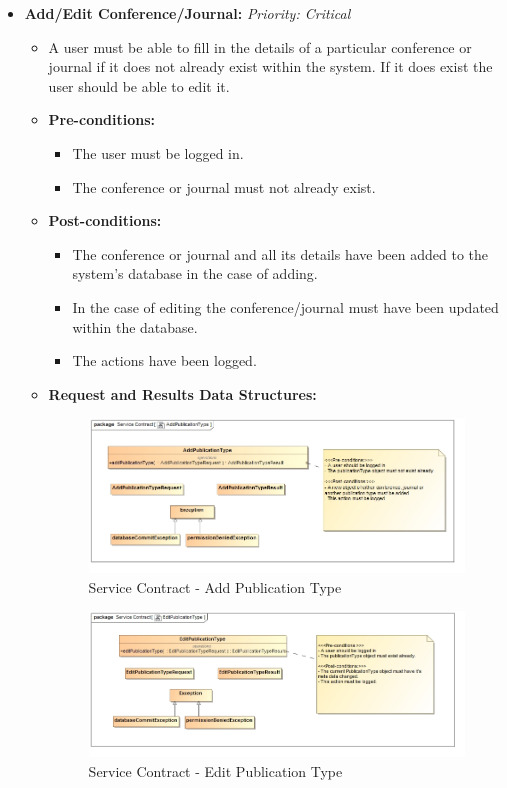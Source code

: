\documentclass{article}
\begin{document}
\begin{itemize}
					\cleardoublepage
					\item \textbf{Add/Edit Conference/Journal:} \hfill \textit{Priority: Critical}
					\begin{itemize}
						\item A user must be able to fill in the details of a particular conference or journal if it does not already exist within the system. If it does exist the user should be able to edit it.
						\item \textbf{Pre-conditions:}
						\begin{itemize}
							\item The user must be logged in.
							\item The conference or journal must not already exist.
						\end{itemize}
						\item \textbf{Post-conditions:}
						\begin{itemize}
							\item The conference or journal and all its details have been added to the system's database in the case of adding.
							\item In the case of editing the conference/journal must have been updated within the database.
							\item The actions have been logged.
						\end{itemize}
						\item \textbf{Request and Results Data Structures:}
						\begin{figure}[H]
							\includegraphics[width=\linewidth]{../Diagrams/ServiceContracts/Publication subsystem/AddPublicationType.jpg}
							\caption{Service Contract - Add Publication Type}
						\end{figure}
						\begin{figure}[H]
							\includegraphics[width=\linewidth]{../Diagrams/ServiceContracts/Publication subsystem/EditPublicationType.jpg}
							\caption{Service Contract - Edit Publication Type}
						\end{figure}
					\end{itemize}								
				\end{itemize}
\end{document}
